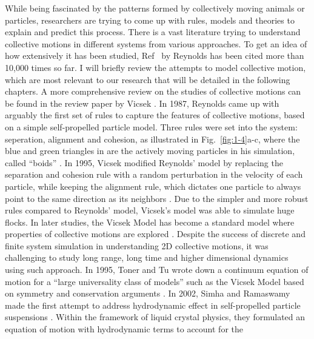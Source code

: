 While being fascinated by the patterns formed by collectively moving animals or particles, researchers are trying to come up with rules, models and theories to explain and predict this process. There is a vast literature trying to understand collective motions in different systems from various approaches. To get an idea of how extensively it has been studied, Ref~\cite{Reynolds1987} by Reynolds has been cited more than 10,000 times so far. I will briefly review the attempts to model collective motion, which are most relevant to our research that will be detailed in the following chapters. A more comprehensive review on the studies of collective motions can be found in the review paper by Vicsek \cite{Vicsek2012}. In 1987, Reynolds came up with arguably the first set of rules to capture the features of collective motions, based on a simple self-propelled particle model. Three rules were set into the system: seperation, alignment and cohesion, as illustrated in Fig.~\ref{fig:1-4}a-c, where  the blue and green triangles in are the actively moving particles in his simulation, called ``boids'' \cite{Reynolds1987}. In 1995, Vicsek modified Reynolds' model by replacing the separation and cohesion rule with a random perturbation in the velocity of each particle, while keeping the alignment rule, which dictates one particle to always point to the same direction as its neighbors \cite{Vicsek1995}. Due to the simpler and more robust rules compared to Reynolds' model, Vicsek's model was able to simulate huge flocks. In later studies, the Vicsek Model has become a standard model where properties of collective motions are explored
\cite{Gregoire2004, Chate2008, Ginelli2010, Ngo2014, Mahault2019}. Despite the success of discrete and finite system simulation in understanding 2D collective motions, it was challenging to study long range, long time and higher dimensional dynamics using such approach. In 1995, Toner and Tu wrote down a continuum equation of motion for a ``large universality class of models'' such as the Vicsek Model based on symmetry and conservation arguments \cite{Toner1995}. In 2002, Simha and Ramaswamy made the first attempt to address hydrodynamic effect in self-propelled particle suspensions \cite{Simha2002}. Within the framework of liquid crystal physics, they formulated an equation of motion with hydrodynamic terms to account for the
